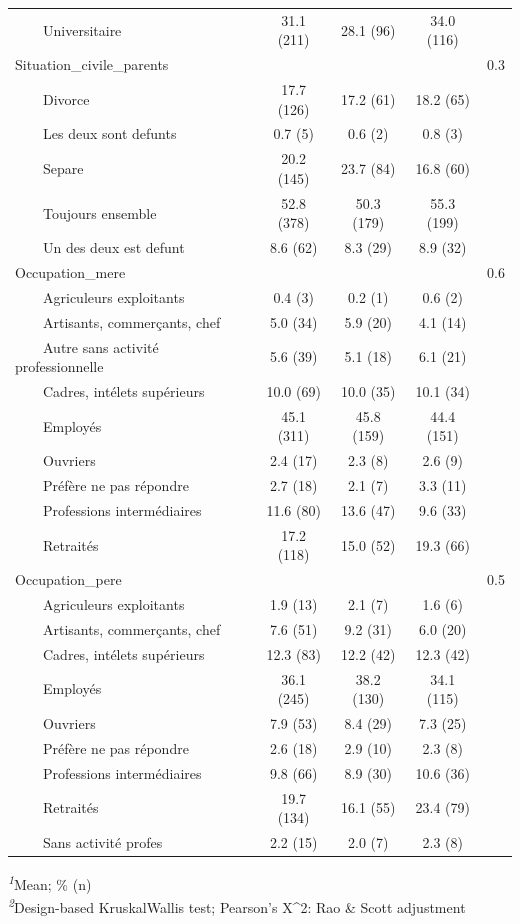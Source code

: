 \documentclass[
]{article}
\begin{document}
\begin{table}[!t]
\begin{tabular*}{\linewidth}{@{\extracolsep{\fill}}lcccc}
    Universitaire & 31.1 (211) & 28.1 (96) & 34.0 (116) &  \\ 
Situation\_civile\_parents &  &  &  & 0.3 \\ 
    Divorce & 17.7 (126) & 17.2 (61) & 18.2 (65) &  \\ 
    Les deux sont defunts & 0.7 (5) & 0.6 (2) & 0.8 (3) &  \\ 
    Separe & 20.2 (145) & 23.7 (84) & 16.8 (60) &  \\ 
    Toujours ensemble & 52.8 (378) & 50.3 (179) & 55.3 (199) &  \\ 
    Un des deux est defunt & 8.6 (62) & 8.3 (29) & 8.9 (32) &  \\ 
Occupation\_mere &  &  &  & 0.6 \\ 
    Agriculeurs exploitants & 0.4 (3) & 0.2 (1) & 0.6 (2) &  \\ 
    Artisants, commerçants, chef & 5.0 (34) & 5.9 (20) & 4.1 (14) &  \\ 
    Autre sans activité professionnelle & 5.6 (39) & 5.1 (18) & 6.1 (21) &  \\ 
    Cadres, intélets supérieurs & 10.0 (69) & 10.0 (35) & 10.1 (34) &  \\ 
    Employés & 45.1 (311) & 45.8 (159) & 44.4 (151) &  \\ 
    Ouvriers & 2.4 (17) & 2.3 (8) & 2.6 (9) &  \\ 
    Préfère ne pas répondre & 2.7 (18) & 2.1 (7) & 3.3 (11) &  \\ 
    Professions intermédiaires & 11.6 (80) & 13.6 (47) & 9.6 (33) &  \\ 
    Retraités & 17.2 (118) & 15.0 (52) & 19.3 (66) &  \\ 
Occupation\_pere &  &  &  & 0.5 \\ 
    Agriculeurs exploitants & 1.9 (13) & 2.1 (7) & 1.6 (6) &  \\ 
    Artisants, commerçants, chef & 7.6 (51) & 9.2 (31) & 6.0 (20) &  \\ 
    Cadres, intélets supérieurs & 12.3 (83) & 12.2 (42) & 12.3 (42) &  \\ 
    Employés & 36.1 (245) & 38.2 (130) & 34.1 (115) &  \\ 
    Ouvriers & 7.9 (53) & 8.4 (29) & 7.3 (25) &  \\ 
    Préfère ne pas répondre & 2.6 (18) & 2.9 (10) & 2.3 (8) &  \\ 
    Professions intermédiaires & 9.8 (66) & 8.9 (30) & 10.6 (36) &  \\ 
    Retraités & 19.7 (134) & 16.1 (55) & 23.4 (79) &  \\ 
    Sans activité profes & 2.2 (15) & 2.0 (7) & 2.3 (8) &  \\ 
\bottomrule
\end{tabular*}
\begin{minipage}{\linewidth}
\textsuperscript{\textit{1}}Mean; \%   (n)\\
\textsuperscript{\textit{2}}Design-based KruskalWallis test; Pearson's X\^{}2: Rao \& Scott adjustment\\
\end{minipage}
\end{table}
\vspace{1cm}
\end{document}

